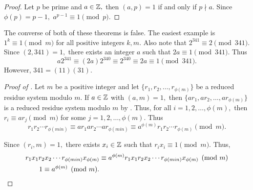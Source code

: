 \documentclass{../ximera}
\begin{document}
\begin{proof}
    Let $p$ be prime and $a\in\mathbb Z,$ then $(a,p)=1$ if and only if $p\nmid a.$ Since $\phi(p)=p-1,$ $a^{p-1}\equiv 1\pmod{p}.$
\end{proof}

\begin{warning}
    The converse of both of these theorems is false. The easiest example is $1^k\equiv 1\pmod{m}$ for all positive integers $k, m$. Also note that $2^{341}\equiv 2\pmod{341}$. Since $(2,341)=1,$ there exists an integer $a$ such that $2a\equiv 1\pmod{341}.$ Thus \[a2^{341}\equiv (2a)2^{340}\equiv 2^{340}\equiv 2a\equiv 1\pmod{341}.\]
    However, $341=(11)(31).$
\end{warning}

\begin{proof}[Proof of ]
    Let $m$ be a positive integer and let $\{r_1,r_2,\dots,r_{\phi(m)}\}$ be a reduced residue system modulo $m.$ If $a\in\mathbb Z$ with $(a,m)=1,$ then $\{ar_1,ar_2,\dots,ar_{\phi(m)}\}$ is a reduced residue system modulo $m$ by . Thus, for all $i=1,2,\dots, \phi(m),$ then $r_i\equiv a r_j\pmod{m}$ for some $j=1,2,\dots,\phi(m).$ Thus \[r_1 r_2\cdots r_{\phi(min)}\equiv ar_1 ar_2\cdots ar_{\phi(min)}\equiv a^{\phi(m)}r_1 r_2\cdots r_{\phi(m)} \pmod{m}.\]

    Since $(r_i,m)=1,$ there exists $x_i\in\mathbb Z$ such that $r_i x_i\equiv 1\pmod{m}.$ Thus, 
    \begin{align*}
        r_1 x_1 r_2 x_2\cdots r_{\phi(min)} x_{\phi(m)}&\equiv a^{\phi(m)} r_1 x_1 r_2 x_2\cdots r_{\phi(min)} x_{\phi(m)} \pmod{m}\\
        1\equiv a^{\phi(m)} \pmod{m}.\qedhere
    \end{align*}
\end{proof}
\end{document}

